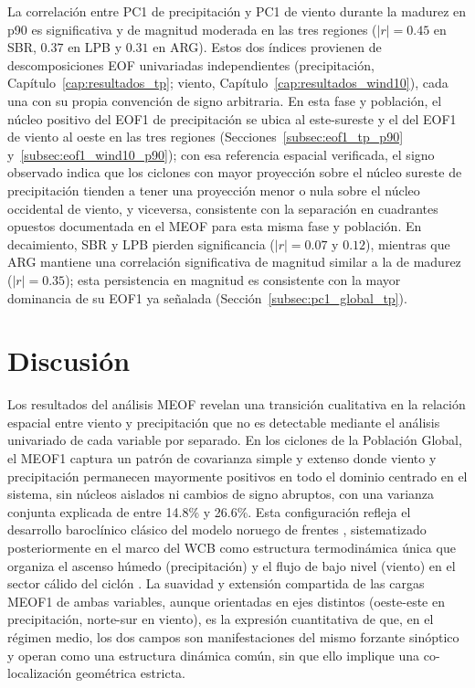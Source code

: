 La correlación entre PC1 de precipitación y PC1 de viento durante la madurez en p90 es significativa y de magnitud moderada en las tres regiones ($|r| = 0.45$ en SBR, $0.37$ en LPB y $0.31$ en ARG). Estos dos índices provienen de descomposiciones EOF univariadas independientes (precipitación, Capítulo~\ref{cap:resultados_tp}; viento, Capítulo~\ref{cap:resultados_wind10}), cada una con su propia convención de signo arbitraria. En esta fase y población, el núcleo positivo del EOF1 de precipitación se ubica al este-sureste y el del EOF1 de viento al oeste en las tres regiones (Secciones~\ref{subsec:eof1_tp_p90} y~\ref{subsec:eof1_wind10_p90}); con esa referencia espacial verificada, el signo observado indica que los ciclones con mayor proyección sobre el núcleo sureste de precipitación tienden a tener una proyección menor o nula sobre el núcleo occidental de viento, y viceversa, consistente con la separación en cuadrantes opuestos documentada en el MEOF para esta misma fase y población. En decaimiento, SBR y LPB pierden significancia ($|r|=0.07$ y $0.12$), mientras que ARG mantiene una correlación significativa de magnitud similar a la de madurez ($|r|=0.35$); esta persistencia en magnitud es consistente con la mayor dominancia de su EOF1 ya señalada (Sección~\ref{subsec:pc1_global_tp}).

\section{Discusión}
\label{sec:discusion_meof}

Los resultados del análisis MEOF revelan una transición cualitativa en la relación espacial entre viento y precipitación que no es detectable mediante el análisis univariado de cada variable por separado.
En los ciclones de la Población Global, el MEOF1 captura un patrón de covarianza simple y extenso donde viento y precipitación permanecen mayormente positivos en todo el dominio centrado en el sistema, sin núcleos aislados ni cambios de signo abruptos, con una varianza conjunta explicada de entre 14.8\% y 26.6\%. Esta configuración refleja el desarrollo baroclínico clásico del modelo noruego de frentes \citep{bjerknes1922life}, sistematizado posteriormente en el marco del WCB como estructura termodinámica única que organiza el ascenso húmedo (precipitación) y el flujo de bajo nivel (viento) en el sector cálido del ciclón \citep{browning1986conceptual}.
La suavidad y extensión compartida de las cargas MEOF1 de ambas variables, aunque orientadas en ejes distintos (oeste-este en precipitación, norte-sur en viento), es la expresión cuantitativa de que, en el régimen medio, los dos campos son manifestaciones del mismo forzante sinóptico y operan como una estructura dinámica común, sin que ello implique una co-localización geométrica estricta.

